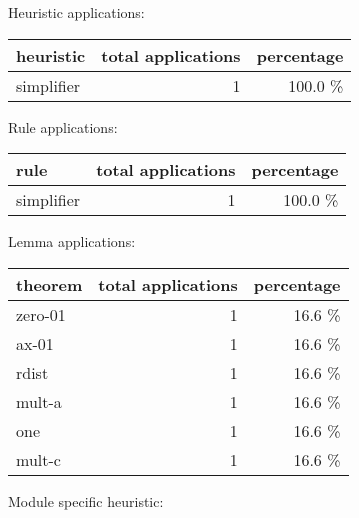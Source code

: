 \documentclass[a4paper]{article}
\begin{document}
\medskip


Heuristic applications:

\begin{supertabular}{l|r|r}
heuristic	& total applications & percentage \\ \hline
simplifier & 1 & 100.0 \% \\

\end{supertabular}

Rule applications:

\begin{supertabular}{l|r|r}
rule	        & total applications & percentage \\ \hline
simplifier & 1 & 100.0 \% \\

\end{supertabular}

Lemma applications:

\begin{supertabular}{l|r|r}
theorem	        & total applications & percentage \\ \hline
zero-01 & 1 & 16.6 \% \\
ax-01 & 1 & 16.6 \% \\
rdist & 1 & 16.6 \% \\
mult-a & 1 & 16.6 \% \\
one & 1 & 16.6 \% \\
mult-c & 1 & 16.6 \% \\

\end{supertabular}

Module specific heuristic:
\end{document}
